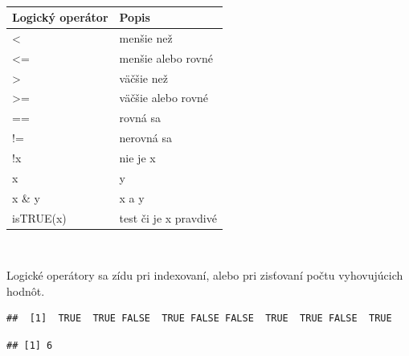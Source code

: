 ~

\begin{longtable}[]{@{}ll@{}}
\toprule
Logický operátor & Popis\tabularnewline
\midrule
\endhead
\textless{} & menšie než\tabularnewline
\textless= & menšie alebo rovné\tabularnewline
\textgreater{} & väčšie než\tabularnewline
\textgreater= & väčšie alebo rovné\tabularnewline
== & rovná sa\tabularnewline
!= & nerovná sa\tabularnewline
!x & nie je x\tabularnewline
x & y\tabularnewline
x \& y & x a y\tabularnewline
isTRUE(x) & test či je x pravdivé\tabularnewline
\bottomrule
\end{longtable}

~

Logické operátory sa zídu pri indexovaní, alebo pri zisťovaní počtu
vyhovujúcich hodnôt.

\begin{Shaded}
\begin{Highlighting}[]
\StringTok{ }\NormalTok{(} \OperatorTok{:}\NormalTok{, } \NormalTok{, } \NormalTok{)}

\NormalTok{ <-}\StringTok{ }\OperatorTok{>}\StringTok{ }

\NormalTok{)}
\end{Highlighting}
\end{Shaded}

\begin{verbatim}
##  [1]  TRUE  TRUE FALSE  TRUE FALSE FALSE  TRUE  TRUE FALSE  TRUE
\end{verbatim}

\begin{Shaded}
\begin{Highlighting}[]
\NormalTok{)}
\end{Highlighting}
\end{Shaded}

\begin{verbatim}
## [1] 6
\end{verbatim}

